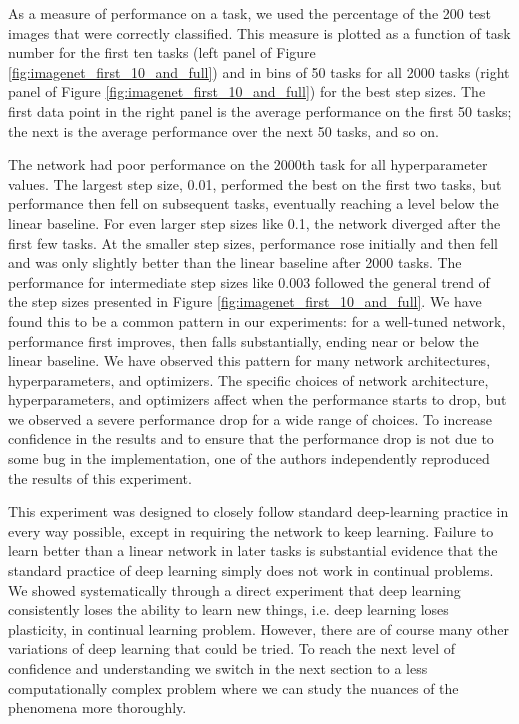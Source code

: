 \documentclass[review, number,3p]{elsarticle}
\begin{document}
As a measure of performance on a task, we used the percentage of the 200 test images that were correctly classified.
This measure is plotted as a function of task number for the first ten tasks (left panel of Figure \ref{fig:imagenet_first_10_and_full}) and in bins of 50 tasks for all 2000 tasks (right panel of Figure \ref{fig:imagenet_first_10_and_full}) for the best step sizes.
The first data point in the right panel is the average performance on the first 50 tasks; the next is the average performance over the next 50 tasks, and so on.

The network had poor performance on the 2000th task for all hyperparameter values. 
The largest step size, 0.01, performed the best on the first two tasks, but performance then fell on subsequent tasks, eventually reaching a level below the linear baseline.
For even larger step sizes like 0.1, the network diverged after the first few tasks.
At the smaller step sizes, performance rose initially and then fell and was only slightly better than the linear baseline after 2000 tasks.
The performance for intermediate step sizes like 0.003 followed the general trend of the step sizes presented in Figure \ref{fig:imagenet_first_10_and_full}. 
We have found this to be a common pattern in our experiments:
for a well-tuned network, performance first improves, then falls substantially, ending near or below the linear baseline.
We have observed this pattern for many network architectures, hyperparameters, and optimizers.
The specific choices of network architecture, hyperparameters, and optimizers affect when the performance starts to drop, but we observed a severe performance drop for a wide range of choices.
To increase confidence in the results and to ensure that the performance drop is not due to some bug in the implementation, one of the authors independently reproduced the results of this experiment.

This experiment was designed to closely follow standard deep-learning practice in every way possible, except in requiring the network to keep learning. 
Failure to learn better than a linear network in later tasks is substantial evidence that the standard practice of deep learning simply does not work in continual problems.
We showed systematically through a direct experiment that deep learning consistently loses the ability to learn new things, i.e. deep learning loses plasticity, in continual learning problem. 
However, there are of course many other variations of deep learning that could be tried.
To reach the next level of confidence and understanding we switch in the next section to a less computationally complex problem where we can study the nuances of the phenomena more thoroughly.
\end{document}
